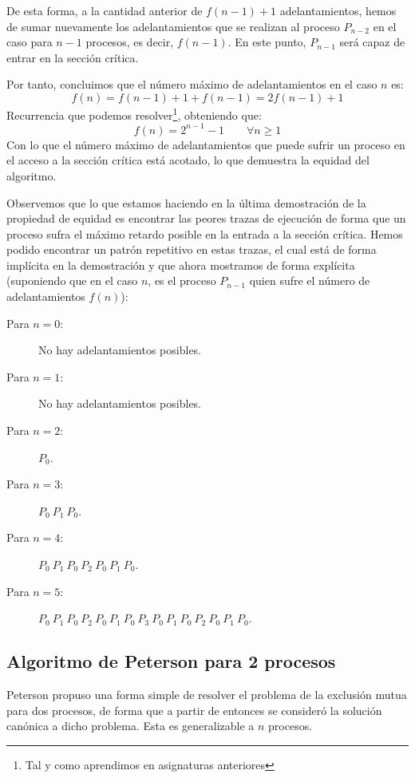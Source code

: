 \begin{description}
\begin{itemize}
                De esta forma, a la cantidad anterior de $f(n-1)+1$ adelantamientos, hemos de sumar nuevamente los adelantamientos que se realizan al proceso $P_{n-2}$ en el caso para $n-1$ procesos, es decir, $f(n-1)$. En este punto, $P_{n-1}$ será capaz de entrar en la sección crítica.
        \end{itemize}
        Por tanto, concluimos que el número máximo de adelantamientos en el caso $n$ es:
        \begin{equation*}
            f(n) = f(n-1) + 1 + f(n-1) = 2f(n-1) + 1
        \end{equation*}
        Recurrencia que podemos resolver\footnote{Tal y como aprendimos en asignaturas anteriores}, obteniendo que:
        \begin{equation*}
            f(n) = 2^{n-1} -1 \qquad \forall n\geq 1
        \end{equation*}
        Con lo que el número máximo de adelantamientos que puede sufrir un proceso en el acceso a la sección crítica está acotado, lo que demuestra la equidad del algoritmo.
\end{description}

\begin{ejemplo}
    Observemos que lo que estamos haciendo en la última demostración de la propiedad de equidad es encontrar las peores trazas de ejecución de forma que un proceso sufra el máximo retardo posible en la entrada a la sección crítica. Hemos podido encontrar un patrón repetitivo en estas trazas, el cual está de forma implícita en la demostración y que ahora mostramos de forma explícita (suponiendo que en el caso $n$, es el proceso $P_{n-1}$ quien sufre el número de adelantamientos $f(n)$):
    \begin{description}
        \item [Para $n=0$:] No hay adelantamientos posibles.
        \item [Para $n=1$:] No hay adelantamientos posibles.
        \item [Para $n=2$:] $P_0$.
        \item [Para $n=3$:] $P_0\ P_1\ P_0$.
        \item [Para $n=4$:] $P_0\ P_1\ P_0\ P_2\ P_0\ P_1\ P_0$.
        \item [Para $n=5$:] $P_0\ P_1\ P_0\ P_2\ P_0\ P_1\ P_0\ P_3\ P_0\ P_1\ P_0\ P_2\ P_0\ P_1\ P_0$.
    \end{description}
\end{ejemplo}

\subsection{Algoritmo de Peterson para 2 procesos}
Peterson propuso una forma simple de resolver el problema de la exclusión mutua para dos procesos, de forma que a partir de entonces se consideró la solución canónica a dicho problema. Esta es generalizable a $n$ procesos.\\

